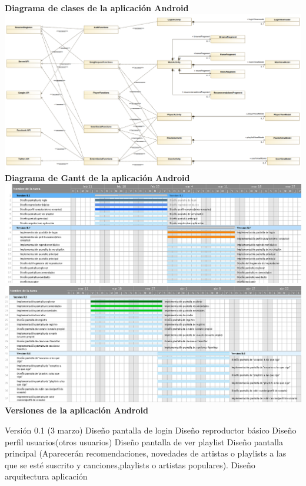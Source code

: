 \documentclass[12pt]{article}%
\begin{document}
\textbf{Diagrama de clases de la aplicaci\'on Android}\\
\includegraphics[width=\linewidth]{Figures/android-class.png}\\

\textbf{Diagrama de Gantt de la aplicaci\'on Android}\\
\includegraphics[width=\linewidth]{Figures/gantt-1.png}\\
\includegraphics[width=\linewidth]{Figures/gantt-2.png}\\

\textbf{Versiones de la aplicaci\'on Android}

Versi\'on 0.1 (3 marzo)
Diseño pantalla de login
Diseño reproductor b\'asico
Diseño perfil usuarios(otros usuarios)
Diseño pantalla de ver playlist
Diseño pantalla principal (Aparecer\'an recomendaciones, novedades de artistas o playlists a las que se est\'e suscrito y canciones,playlists o artistas populares).
Diseño arquitectura aplicaci\'on
\end{document}
